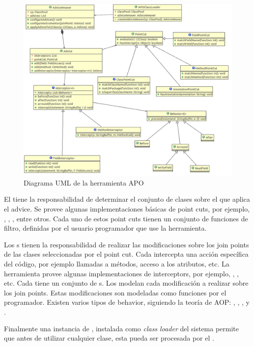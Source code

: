 \begin{figure}[!htb]
	\centering
	\includegraphics[scale=0.4]{img/apo}
	\caption{Diagrama UML de la herramienta APO}
	\label{aopImage}
\end{figure}	 


El  tiene la responsabilidad de determinar el conjunto de
clases sobre el que aplica el advice. Se provee algunas implementaciones básicas
de point cuts, por ejemplo, , , 
, entre otros. Cada uno de estos point cuts tienen un conjunto de funciones
de filtro, definidas por el usuario programador que use la herramienta. 

Los s tienen la responsabilidad de realizar las modificaciones sobre 
los join points de las clases seleccionadas por el point cut. 
Cada  intercepta una acción específica del código, por ejemplo
llamadas a métodos, acceso a los atributos, etc. La herramienta provee algunas implementaciones de interceptors,
por ejemplo, , , etc. 
Cada  tiene un conjunto de s.
Los  modelan cada modificación a realizar sobre los join points. 
Estas modificaciones son modeladas como funciones por el programador.
Existen varios tipos de behavior, siguiendo la teoría de AOP: 
, , ,  y . 
 
Finalmente una instancia de , instalada como \emph{class
loader} del sistema permite que antes de utilizar cualquier clase, esta pueda
ser procesada por el .

